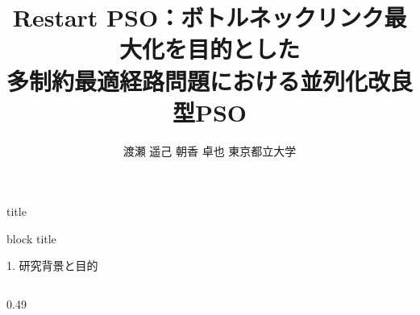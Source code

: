\documentclass[final,t]{beamer}
\title{\texorpdfstring{Restart PSO：ボ\hspace{0.06em}ト\hspace{-0.2em}ルネックリンク最大化を目的とした\\多制約最適経路問題における並列化改良型PSO}{ボトルネックリンク最大化を目的とした多制約最適経路問題における並列化改良型PSO}}
\author{渡瀬 遥己 \quad 朝香 卓也 \quad 東京都立大学}
\date{}
\begin{document}
\begin{frame}[fragile]

    

    \vspace{-0.7cm}
\begin{beamercolorbox}[wd=\paperwidth,sep=1.5cm,center]{title}
    \inserttitle\par
    \vspace{0.5cm}
    \insertauthor\par
\end{beamercolorbox}

\vspace{1.0cm}

\begin{beamercolorbox}[wd=\textwidth, sep=0.4cm, leftskip=0.5em]{block title}
    \strut 1. 研究背景と目的
\end{beamercolorbox}
\vspace{-2.0cm}

\begin{columns}[t, onlytextwidth] 

    \begin{column}{0.49\textwidth}
        

\end{column}
\end{columns}
\end{frame}
\end{document}
